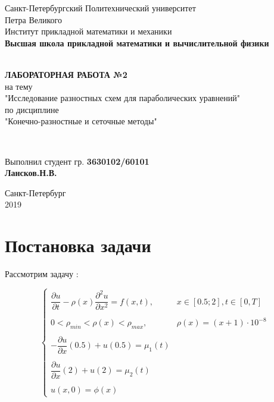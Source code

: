 \documentclass[12pt]{article}
\renewcommand{\listoffigures}{\begingroup  %
\tocsection
\tocfile{\listfigurename}{lof}
\endgroup}
\renewcommand{\listoftables}{\begingroup  %
\tocsection
\tocfile{\listtablename}{lot}
\endgroup}
\begin{document}
\begin{titlepage}
	\center
		Санкт-Петербургский Политехнический 
		университет \\ Петра Великого\\
		Институт прикладной математики и механики
		\\ \textbf{Высшая школа прикладной математики и вычислительной физики}

	\vfill ~
	\textbf{
		\\ \large ЛАБОРАТОРНАЯ РАБОТА №2
	}
	\\	на тему 
	\\ "Исследование разностных схем для параболических уравнений"
	\\ по дисциплине
	\\ "Конечно-разностные и сеточные методы"

	\vfill ~

	Выполнил студент гр. \textbf{3630102/60101} \\
	\textbf{Лансков.Н.В.} \\ 

\vfill

{\large}	Санкт-Петербург
\\ 2019
\end{titlepage}


\tableofcontents 
\newpage
\listoffigures
\newpage
\listoftables
\newpage

\section{Постановка задачи}

Рассмотрим задачу :

$$
\begin{cases}
\dfrac{\partial u}{\partial t} - \rho(x)\dfrac{\partial ^2u}{\partial x^2} = f(x, t), & x \in [0.5;2],  t \in [0, T] \\ \\
0 < \rho_{min} < \rho(x) < \rho_{max}, & \rho(x) = (x+1)\cdot10^{-8} \\ \\
 - \dfrac{\partial u}{\partial x}(0.5) + u(0.5) = \mu_1(t) \\ \\
\dfrac{\partial u}{\partial x}(2) + u(2) = \mu_2(t) \\ \\
u(x, 0) = \phi(x)
\end{cases}
$$
\end{document}
